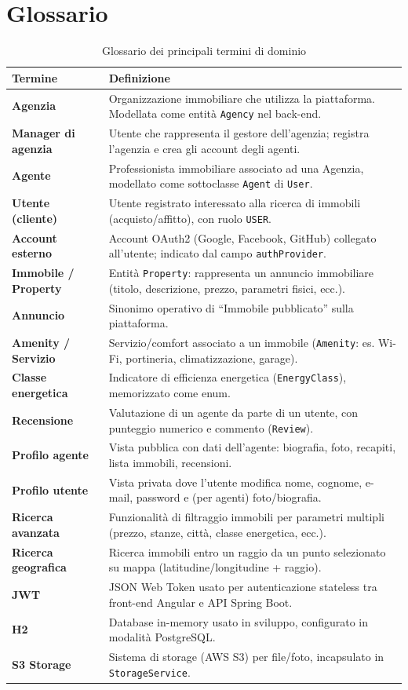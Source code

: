\documentclass[a4paper,11pt]{report}
\begin{document}
\pagebreak

\section{Glossario}

\begin{table}[H]
\centering
\renewcommand{\arraystretch}{1.2}
\begin{tabularx}{\textwidth}{>{\bfseries}l X}
\toprule
Termine & Definizione \\
\midrule
Agenzia & Organizzazione immobiliare che utilizza la piattaforma. Modellata come entità \texttt{Agency} nel back-end.\\
Manager di agenzia & Utente che rappresenta il gestore dell’agenzia; registra l’agenzia e crea gli account degli agenti.\\
Agente & Professionista immobiliare associato ad una Agenzia, modellato come sottoclasse \texttt{Agent} di \texttt{User}.\\
Utente (cliente) & Utente registrato interessato alla ricerca di immobili (acquisto/affitto), con ruolo \texttt{USER}.\\
Account esterno & Account OAuth2 (Google, Facebook, GitHub) collegato all’utente; indicato dal campo \texttt{authProvider}.\\
Immobile / Property & Entità \texttt{Property}: rappresenta un annuncio immobiliare (titolo, descrizione, prezzo, parametri fisici, ecc.).\\
Annuncio & Sinonimo operativo di ``Immobile pubblicato'' sulla piattaforma.\\
Amenity / Servizio & Servizio/comfort associato a un immobile (\texttt{Amenity}: es. Wi-Fi, portineria, climatizzazione, garage).\\
Classe energetica & Indicatore di efficienza energetica (\texttt{EnergyClass}), memorizzato come enum.\\
Recensione & Valutazione di un agente da parte di un utente, con punteggio numerico e commento (\texttt{Review}).\\
Profilo agente & Vista pubblica con dati dell’agente: biografia, foto, recapiti, lista immobili, recensioni.\\
Profilo utente & Vista privata dove l’utente modifica nome, cognome, e-mail, password e (per agenti) foto/biografia.\\
Ricerca avanzata & Funzionalità di filtraggio immobili per parametri multipli (prezzo, stanze, città, classe energetica, ecc.).\\
Ricerca geografica & Ricerca immobili entro un raggio da un punto selezionato su mappa (latitudine/longitudine + raggio).\\
JWT & JSON Web Token usato per autenticazione stateless tra front-end Angular e API Spring Boot.\\
H2 & Database in-memory usato in sviluppo, configurato in modalità PostgreSQL.\\
S3 Storage & Sistema di storage (AWS S3) per file/foto, incapsulato in \texttt{StorageService}.\\
\bottomrule
\end{tabularx}
\caption{Glossario dei principali termini di dominio}
\end{table}
\end{document}
